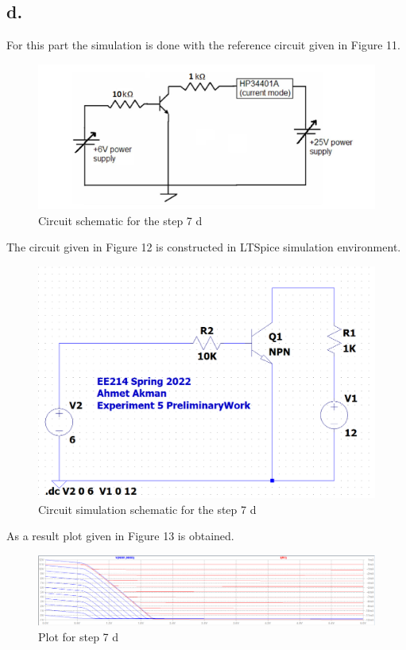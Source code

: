 \documentclass[letterpaper,12pt]{article}
\begin{document}
\subsection{d.}

For this part the simulation is done with the reference circuit given in Figure 11.
\begin{figure}[H]
    \centering
    \includegraphics[width=1\textwidth]{fig7.png}
    \caption{Circuit schematic for the step 7 d}
    \end{figure} 
    The circuit given in Figure 12 is constructed in LTSpice simulation environment.
\begin{figure}[H]
\centering
\includegraphics[width=1\textwidth]{7sim.png}
\caption{Circuit simulation schematic for the step 7 d}
\end{figure} 
As a result plot given in Figure 13 is obtained.
\begin{figure}[H]
    \centering
    \includegraphics[width=1\textwidth]{7_c_plot.png}
\caption{Plot for step 7 d}
\end{figure} 
\end{document}
